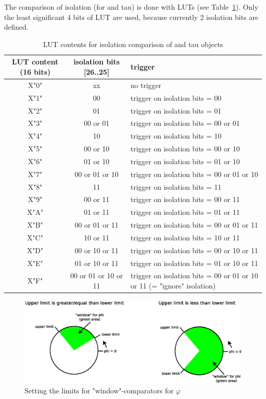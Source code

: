 The comparison of isolation (for \egamma and tau) is done with LUTs (see Table~\ref{tab:gtl:calo_lut_iso}).
Only the least significant 4 bits of LUT are used, because currently 2 isolation bits are defined. 

\begin{table}[htdp]
\begin{center}
\begin{tabular}{|c|c|p{}|}\hline
LUT content (16 bits) & isolation bits [26..25] & trigger \\\hline\hline
X"0" & xx & no trigger\\\hline
X"1" & 00 & trigger on isolation bits = 00\\\hline
X"2" & 01 & trigger on isolation bits = 01\\\hline
X"3" & 00 or 01 & trigger on isolation bits = 00 or 01\\\hline
X"4" & 10 & trigger on isolation bits = 10\\\hline
X"5" & 00 or 10 & trigger on isolation bits = 00 or 10\\\hline
X"6" & 01 or 10 & trigger on isolation bits = 01 or 10\\\hline
X"7" & 00 or 01 or 10 & trigger on isolation bits = 00 or 01 or 10\\\hline
X"8" & 11 & trigger on isolation bits = 11\\\hline
X"9" & 00 or 11 & trigger on isolation bits = 00 or 11\\\hline
X"A" & 01 or 11 & trigger on isolation bits = 01 or 11\\\hline
X"B" & 00 or 01 or 11 & trigger on isolation bits = 00 or 01 or 11\\\hline
X"C" & 10 or 11 & trigger on isolation bits = 10 or 11\\\hline
X"D" & 00 or 10 or 11 & trigger on isolation bits = 00 or 10 or 11\\\hline
X"E" & 01 or 10 or 11 & trigger on isolation bits = 01 or 10 or 11\\\hline
X"F" & 00 or 01 or 10 or 11 & trigger on isolation bits = 00 or 01 or 10 or 11 (= "ignore" isolation)\\\hline
\end{tabular}
\end{center}
\caption{LUT contents for isolation comparison of \egamma and tau objects}
\label{tab:gtl:calo_lut_iso}
\end{table}

\begin{figure}[htb]
\centering
\includegraphics[width=15cm]{figures/phi_windows_comparator}
\caption{Setting the limits for "window"-comparators for $\varphi$} 
\label{fig:gtl:phi_windows_comparator}
\end{figure}

